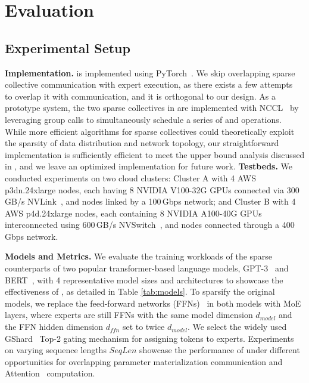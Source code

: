 \section{Evaluation}\label{sec:eval}

\subsection{Experimental Setup}\label{sec:eval:setup}

\textbf{Implementation.}
\xxx is implemented using PyTorch~\cite{paszke2019pytorch}.
We skip overlapping sparse collective communication with expert execution, as there exists a few attempts~\cite{he2022fastermoe,hwang2022tutel} to overlap it with \collatoa communication, and it is orthogonal to our design.
As a prototype system, the two sparse collectives in \xxx are implemented with NCCL~\cite{nccl2020docs} by leveraging group calls to simultaneously schedule a series of \collbc and \collrd operations.
While more efficient algorithms for sparse collectives could theoretically exploit the sparsity of data distribution and network topology, our straightforward implementation is sufficiently efficient to meet the upper bound analysis discussed in , and we leave an optimized implementation for future work.
\newline
\textbf{Testbeds.}
We conducted experiments on two cloud clusters:
Cluster A with 4 AWS p3dn.24xlarge nodes, each having 8 NVIDIA V100-32G GPUs connected via 300\,GB/s NVLink~\cite{nvlink2022docs}, and nodes linked by a 100\,Gbps network; and
Cluster B with 4 AWS p4d.24xlarge nodes, each containing 8 NVIDIA A100-40G GPUs interconnected using 600\,GB/s NVSwitch~\cite{nvswitch2022docs}, and nodes connected through a 400\,Gbps network.


\textbf{Models and Metrics.}
We evaluate the training workloads of the sparse counterparts of two popular transformer-based language models, GPT-3~\cite{brown2020language} and BERT~\cite{Devlin2019BERTPO}, with 4 representative model sizes and architectures to showcase the effectiveness of \xxx, as detailed in Table \ref{tab:models}.
To sparsify the original models, we replace the feed-forward networks (FFNs)~\cite{vaswani2017attention} in both models with MoE layers, where experts are still FFNs with the same model dimension $d_{model}$ and the FFN hidden dimension $d_{ffn}$ set to twice $d_{model}$.
We select the widely used GShard~\cite{lepikhin2020gshard} Top-2 gating mechanism for assigning tokens to experts.
Experiments on varying sequence lengths $SeqLen$ showcase the performance of \xxx under different opportunities for overlapping parameter materialization communication and Attention~\cite{vaswani2017attention} computation.

